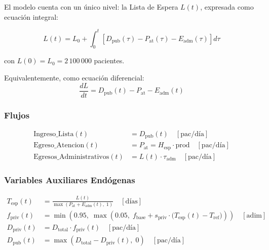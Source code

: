 \documentclass[12pt,a4paper]{article}
\begin{document}
El modelo cuenta con un único nivel: la Lista de Espera $L(t)$, expresada como ecuación integral:

\begin{equation}
\boxed{
L(t) = L_0 + \int_0^t \left[ D_{\text{pub}}(\tau) - P_{\text{at}}(\tau) - E_{\text{adm}}(\tau) \right] d\tau
}
\label{eq:nivel}
\end{equation}

con $L(0) = L_0 = 2\,100\,000$ pacientes.

Equivalentemente, como ecuación diferencial:
\begin{equation}
\frac{dL}{dt} = D_{\text{pub}}(t) - P_{\text{at}} - E_{\text{adm}}(t)
\end{equation}

\subsubsection*{Flujos}

\begin{align}
\text{Ingreso\_Lista}(t)                   &= D_{\text{pub}}(t) \quad [\text{pac/día}] \label{eq:ingreso}\\
\text{Egreso\_Atencion}(t)                 &= P_{\text{at}} = H_{\text{esp}} \cdot \text{prod} \quad [\text{pac/día}] \label{eq:egreso}\\
\text{Egresos\_Administrativos}(t)         &= L(t) \cdot \tau_{\text{adm}} \quad [\text{pac/día}] \label{eq:egresoAdm}
\end{align}

\subsubsection*{Variables Auxiliares Endógenas}

\begin{align}
T_{\text{esp}}(t) &= \frac{L(t)}{\max\!\left(P_{\text{at}} + E_{\text{adm}}(t),\; 1\right)}
  \quad [\text{días}] \label{eq:tespera}\\[6pt]
f_{\text{priv}}(t) &= \min\!\left(0.95,\; \max\!\left(0.05,\;
  f_{\text{base}} + s_{\text{priv}} \cdot \bigl(T_{\text{esp}}(t) - T_{\text{ref}}\bigr)\right)\right)
  \quad [\text{adim}] \label{eq:fpriv}\\[6pt]
D_{\text{priv}}(t) &= D_{\text{total}} \cdot f_{\text{priv}}(t) \quad [\text{pac/día}] \label{eq:dpriv}\\[6pt]
D_{\text{pub}}(t)  &= \max\!\left(D_{\text{total}} - D_{\text{priv}}(t),\; 0\right) \quad [\text{pac/día}] \label{eq:dpub}
\end{align}
\end{document}
